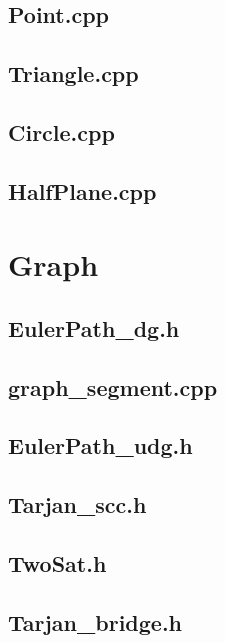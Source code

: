 \subsection{Point.cpp}

\subsection{Triangle.cpp}

\subsection{Circle.cpp}

\subsection{HalfPlane.cpp}

\section{Graph}
\subsection{EulerPath\_dg.h}

\subsection{graph\_segment.cpp}

\subsection{EulerPath\_udg.h}

\subsection{Tarjan\_scc.h}

\subsection{TwoSat.h}

\subsection{Tarjan\_bridge.h}

